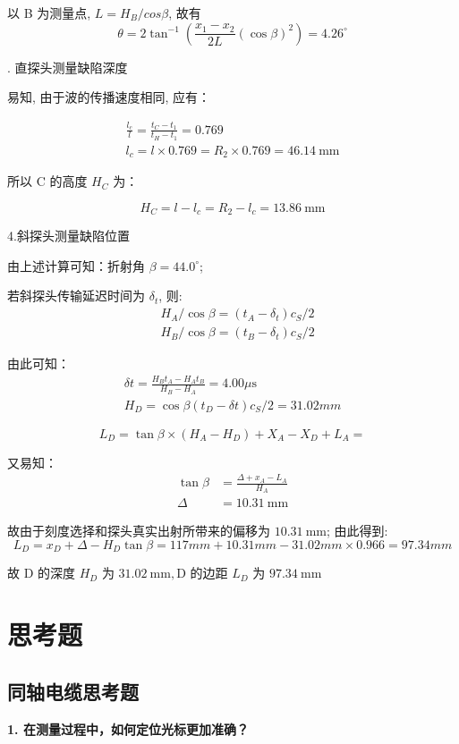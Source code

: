 \documentclass[UTF8]{ctexart}
\begin{document}
以 B 为测量点, $L=H_{B}/cos\beta$, 故有
$$
\theta=2 \tan ^{-1}\left(\frac{x_{1}-x_{2}}{2 L}(\cos \beta)^{2}\right)=4.26^{\circ}
$$

. 直探头测量缺陷深度

易知, 由于波的传播速度相同, 应有：

$$
\begin{gathered}
\frac{l_{c}}{l}=\frac{t_{C}-t_{1}}{t_{H}-t_{1}}=0.769 \\
l_{c}=l \times 0.769=R_{2} \times 0.769=46.14 \mathrm{~mm}
\end{gathered}
$$

所以 $\mathrm{C}$ 的高度 $H_{C}$ 为：

$$
H_{C}=l-l_{c}=R_{2}-l_{c}=13.86 \mathrm{~mm}
$$

\noindent 4.斜探头测量缺陷位置

由上述计算可知：折射角 $\beta=44.0^{\circ}$;

若斜探头传输延迟时间为 $\delta_t$, 则:
$$
\begin{aligned}
&H_{A} / \cos \beta=\left(t_{A}-\delta_t\right) c_{S} / 2 \\
&H_{B} / \cos \beta=\left(t_{B}-\delta_t\right) c_{S} / 2
\end{aligned}
$$

由此可知：
$$
\begin{gathered}
\delta t=\frac{H_{B} t_{A}-H_{A} t_{B}}{H_{B}-H_{A}}=4.00 \mu \mathrm{s} \\
H_{D}=\cos \beta\left(t_{D}-\delta t\right) c_{S} / 2=31.02 m m
\end{gathered}
$$

$$
L_D=\tan{\beta}\times\left(H_A-H_D\right)+X_A-X_D+L_A=
$$

又易知：
$$
\begin{aligned}
\tan \beta &=\frac{\Delta+x_{A}-L_{A}}{H_{A}} \\
\Delta &=10.31 \mathrm{~mm}
\end{aligned}
$$

故由于刻度选择和探头真实出射所带来的偏移为 $10.31 \mathrm{~mm}$; 由此得到:
$$
L_{D}=x_{D}+\Delta-H_{D} \tan \beta=117 m m+10.31 m m-31.02 m m \times 0.966=97.34 m m
$$

故 $\mathrm{D}$ 的深度 $H_{D}$ 为 $31.02 \mathrm{~mm}, \mathrm{D}$ 的边距 $L_{D}$ 为 $97.34 \mathrm{~mm}$ 


\section{思考题}
\subsection{同轴电缆思考题}
\noindent \textbf{1. 在测量过程中，如何定位光标更加准确？}
\end{document}
